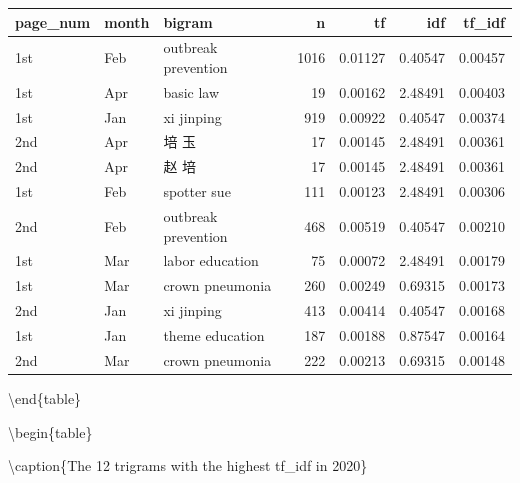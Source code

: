 \documentclass[
  12pt,
]{article}
\begin{document}
\begin{tabular}[t]{lllrrrr}
\toprule
page\_num & month & bigram & n & tf & idf & tf\_idf\\
\midrule
1st & Feb & outbreak prevention & 1016 & 0.01127 & 0.40547 & 0.00457\\
1st & Apr & basic law & 19 & 0.00162 & 2.48491 & 0.00403\\
1st & Jan & xi jinping & 919 & 0.00922 & 0.40547 & 0.00374\\
2nd & Apr & 培 玉 & 17 & 0.00145 & 2.48491 & 0.00361\\
2nd & Apr & 赵 培 & 17 & 0.00145 & 2.48491 & 0.00361\\
\addlinespace
1st & Feb & spotter sue & 111 & 0.00123 & 2.48491 & 0.00306\\
2nd & Feb & outbreak prevention & 468 & 0.00519 & 0.40547 & 0.00210\\
1st & Mar & labor education & 75 & 0.00072 & 2.48491 & 0.00179\\
1st & Mar & crown pneumonia & 260 & 0.00249 & 0.69315 & 0.00173\\
2nd & Jan & xi jinping & 413 & 0.00414 & 0.40547 & 0.00168\\
\addlinespace
1st & Jan & theme education & 187 & 0.00188 & 0.87547 & 0.00164\\
2nd & Mar & crown pneumonia & 222 & 0.00213 & 0.69315 & 0.00148\\
\bottomrule
\end{tabular}

\textbackslash end\{table\}

\textbackslash begin\{table\}

\textbackslash caption\{\label{tab:trigrams}The 12 trigrams with the highest tf\_idf in 2020\}
\centering
\end{document}
